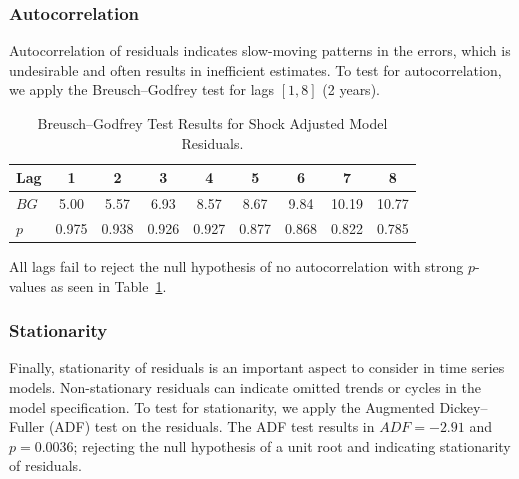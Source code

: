 \subsubsection{Autocorrelation}\label{subsubsec:residual_autocorrelation}
Autocorrelation of residuals indicates slow-moving patterns in the errors, which is undesirable and often results in inefficient estimates.
To test for autocorrelation, we apply the Breusch--Godfrey test for lags $[1,8]$ (2 years).

\begin{table}[H]
    \centering
    \begin{tabular}{lcccccccc}
        \toprule
        \textbf{Lag} & 1 & 2 & 3 & 4 & 5 & 6 & 7 & 8 \\
        \midrule
        \textbf{$BG$} & 5.00 & 5.57 & 6.93 & 8.57 & 8.67 & 9.84 & 10.19 & 10.77 \\
        \textbf{$p$} & 0.975 & 0.938 & 0.926 & 0.927 & 0.877 & 0.868 & 0.822 & 0.785 \\
        \bottomrule
    \end{tabular}
    \caption{Breusch--Godfrey Test Results for Shock Adjusted Model Residuals.}
    \label{tab:shockadj_bg_results}
\end{table}
\noindent All lags fail to reject the null hypothesis of no autocorrelation with strong $p$-values as seen in Table~\ref{tab:shockadj_bg_results}.

\subsubsection{Stationarity}\label{subsubsec:residual_stationarity}
Finally, stationarity of residuals is an important aspect to consider in time series models.
Non-stationary residuals can indicate omitted trends or cycles in the model specification.
To test for stationarity, we apply the Augmented Dickey--Fuller (ADF) test on the residuals.
The ADF test results in $ADF = -2.91$ and $p=0.0036$; rejecting the null hypothesis of a unit root and indicating stationarity of residuals.

